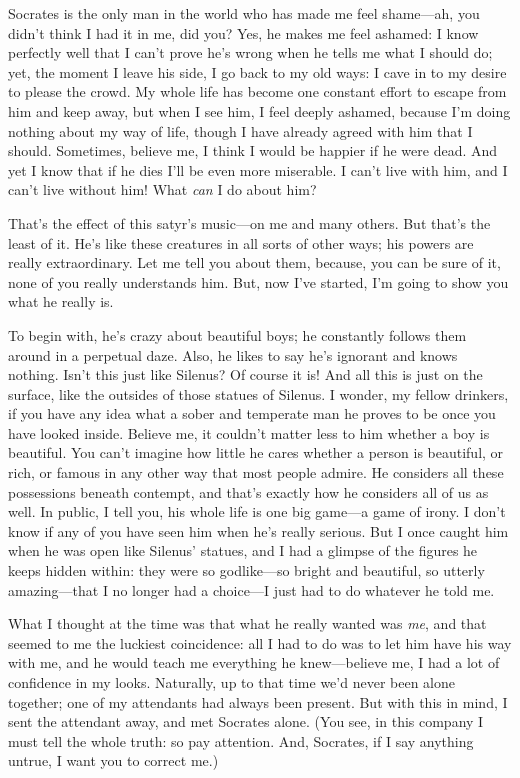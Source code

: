 Socrates is the only man in the world who has made me feel shame---ah,
you didn't think I had it in me, did you? Yes, he makes me feel ashamed:
I know perfectly well that I can't prove he's wrong when he tells me
what I should do; yet, the moment I leave his side, I go back to my old
ways: I cave in to my desire to please the crowd. My whole life has
become one constant effort to escape from him and keep away, but when I
see him, I  feel deeply ashamed, because I'm doing nothing about
my way of life, though I have already agreed with him that I should.
Sometimes, believe me, I think I would be happier if he were dead. And
yet I know that if he dies I'll be even more miserable. I can't live
with him, and I can't live without him! What {\em can} I do about him?

That's the effect of this satyr's music---on me and many others. But
that's the least of it. He's like these creatures in all sorts of other
ways; his powers are really extraordinary. Let me tell you about them,
because,  you can be sure of it, none of you really understands
him. But, now I've started, I'm going to show you what he really is.

To begin with, he's crazy about beautiful boys; he constantly follows
them around in a perpetual daze. Also, he likes to say he's ignorant and
knows nothing. Isn't this just like Silenus? Of course it is! And all
this is just on the surface, like the outsides of those statues of
Silenus. I wonder, my fellow drinkers, if you have any idea what a sober
and temperate man he proves to be once you have looked inside. Believe
me, it couldn't matter less to him whether a boy is beautiful. You can't
imagine how little he  cares whether a person is beautiful, or
rich, or famous in any other way that most people admire. He considers
all these possessions beneath contempt, and that's exactly how he
considers all of us as well. In public, I tell you, his whole life is
one big game---a game of irony. I don't know if any of you have seen him
when he's really serious. But I once caught him when he was open like
Silenus' statues, and I had a glimpse of the figures he keeps hidden
within: they were so godlike---so bright and beautiful, 
so utterly amazing---that I no longer had a choice---I just had to do
whatever he told me.

What I thought at the time was that what he really wanted was {\em me},
and that seemed to me the luckiest coincidence: all I had to do was to
let him have his way with me, and he would teach me everything he
knew---believe me, I had a lot of confidence in my looks. Naturally, up
to that time we'd never been alone together; one of my attendants had
always been present. But with this in mind, I sent the attendant away,
and met  Socrates alone. (You see, in this company I must tell
the whole truth: so pay attention. And, Socrates, if I say anything
untrue, I want you to correct me.)

